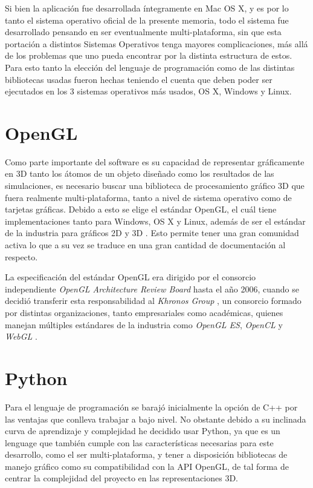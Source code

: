 Si bien la aplicación fue desarrollada íntegramente en Mac OS X, y es por lo tanto el sistema operativo oficial de la presente memoria, todo el sistema fue desarrollado pensando en ser eventualmente multi-plataforma, sin que esta portación a distintos Sistemas Operativos tenga mayores complicaciones, más allá de los problemas que uno pueda encontrar por la distinta estructura de estos. Para esto tanto la elección del lenguaje de programación como de las distintas bibliotecas usadas fueron hechas teniendo el cuenta que deben poder ser ejecutados en los 3 sistemas operativos más usados, OS X, Windows y Linux.

\section{OpenGL}

Como parte importante del software es su capacidad de representar gráficamente en 3D tanto los átomos de un objeto diseñado como los resultados de las simulaciones, es necesario buscar una biblioteca de procesamiento gráfico 3D que fuera realmente multi-plataforma, tanto a nivel de sistema operativo como de tarjetas gráficas. Debido a esto se elige el estándar OpenGL, el cuál tiene implementaciones tanto para Windows, OS X y Linux, además de ser el estándar de la industria para gráficos 2D y 3D \citep{website:AboutOpenGL}. Esto permite tener una gran comunidad activa lo que a su vez se traduce en una gran cantidad de documentación al respecto.

La especificación del estándar OpenGL era dirigido por el consorcio independiente \emph{OpenGL Architecture Review Board} hasta el año 2006, cuando se decidió transferir esta responsabilidad al \emph{Khronos Group} \citep{website:OpenGLARB}, un consorcio formado por distintas organizaciones, tanto empresariales como académicas, quienes manejan múltiples estándares de la industria como \emph{OpenGL ES}, \emph{OpenCL} y \emph{WebGL} \citep{website:KhronosGroup}.

\section{Python}

Para el lenguaje de programación se barajó inicialmente la opción de C++ por las ventajas que conlleva trabajar a bajo nivel. No obstante debido a su inclinada curva de aprendizaje y complejidad he decidido usar Python, ya que es un lenguage que también cumple con las características necesarias para este desarrollo, como el ser multi-plataforma, y tener a disposición bibliotecas de manejo gráfico como su compatibilidad con la API OpenGL, de tal forma de centrar la complejidad del proyecto en las representaciones 3D.


